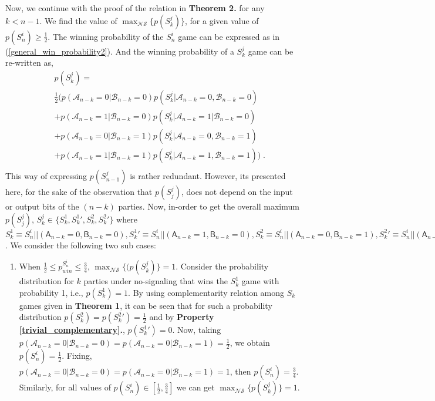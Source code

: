 \begin{widetext}
\begin{appendices}
Now, we continue with the proof of the relation in \textbf{Theorem 2.} for any $k < n-1$. We find the value of $\max_{\mathcal{NS}}\{p(S_{k}^j)\}$, for a given value of $p({S_n^i})\ge \frac{1}{2}$. The winning probability of the $S_n^i$ game can be expressed as in (\ref{general_win_probability2}). And the winning probability of a $S_k^j$ game can be re-written as,
\begin{eqnarray}
\label{general_win_probability2}
&&p({S_k^j}) ={}\nonumber\\&& \frac{1}{2} \bigg( p(\mathcal{A}_{n-k}=0|\mathcal{B}_{n-k}=0)p({S_k^j}|\mathcal{A}_{n-k}=0,\mathcal{B}_{n-k}=0){}\nonumber\\&&+p(\mathcal{A}_{n-k}=1|\mathcal{B}_{n-k}=0)p({S_k^j}|\mathcal{A}_{n-k}=1|\mathcal{B}_{n-k}=0) \nonumber\\&&
+p(\mathcal{A}_{n-k}=0|\mathcal{B}_{n-k}=1)p({S_k^j}|\mathcal{A}_{n-k}=0,\mathcal{B}_{n-k}=1){}\nonumber\\&&+p(\mathcal{A}_{n-k}=1|\mathcal{B}_{n-k}=1)p({S_k^j}|\mathcal{A}_{n-k}=1,\mathcal{B}_{n-k}=1) \bigg) \;.{}\nonumber\\&& 
\end{eqnarray}
This way of expressing $p(S_{n-1}^j)$ is rather redundant. However, its presented here, for the sake of the observation that $p(S_{j}^j)$, does not depend on the input or output bits of the $(n-k)$ parties. Now, in-order to get the overall maximum $p(S_{j}^j)$, $S_k^j \in \{ S_k^1,{S_k^1}',S_k^2,{S_k^2}'\}$ where $S_k^1\equiv S_n^i||(\mathsf{A}_{n-k}=0,\mathsf{B}_{n-k}=0),{S_k^1}'\equiv S_n^i||(\mathsf{A}_{n-k}=1,\mathsf{B}_{n-k}=0),S_k^2\equiv S_n^i||(\mathsf{A}_{n-k}=0,\mathsf{B}_{n-k}=1),{S_k^2}'\equiv S_n^i||(\mathsf{A}_{n-k}=1,\mathsf{B}_{n-k}=1)$. We consider the following two sub cases:
\begin{enumerate}
\item When $\frac{1}{2} \le p_{win}^{S_n^i} \le \frac{3}{4}$, $\max_{\mathcal{NS}}\{(p(S_{k}^j)\}=1$. Consider the probability distribution for $k$ parties under no-signaling that wins the $S_{k}^1$ game with probability 1, i.e., $p(S_{k}^1)=1$. By using complementarity relation among $S_k$ games given in \textbf{Theorem 1}, it can be seen that for such a probability distribution $p(S_{k}^2)=p({S_{k}^2}')=\frac{1}{2}$ and by \textbf{Property \ref{trivial_complementary}.}, $p({S_{k}^1}')=0$. Now, taking $p(\mathcal{A}_{n-k}=0|\mathcal{B}_{n-k}=0)=p(\mathcal{A}_{n-k}=0|\mathcal{B}_{n-k}=1)=\frac{1}{2}$, we obtain  $p({S_n^i})=\frac{1}{2}$. Fixing,  $p(\mathcal{A}_{n-k}=0|\mathcal{B}_{n-k}=0)=p(\mathcal{A}_{n-k}=0|\mathcal{B}_{n-k}=1)=1$, then $p({S_n^i})=\frac{3}{4}$. Similarly, for all values of $p({S_n^i}) \in [\frac{1}{2},\frac{3}{4}]$ we can get $\max_{\mathcal{NS}}\{p(S_{k}^j)\}=1$. 

\end{enumerate}
\end{appendices}
\end{widetext}
